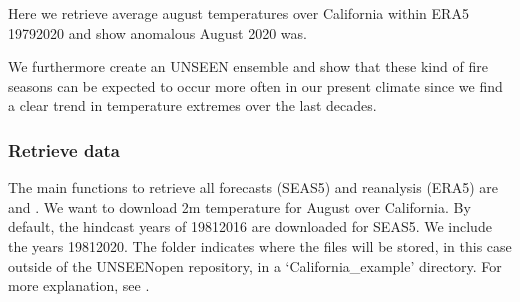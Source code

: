 \documentclass[letterpaper,10pt,english]{sphinxmanual}
\let\sphinxpxdimen\pdfpxdimen\else\newdimen\sphinxpxdimen
\begin{document}
Here we retrieve average august temperatures over California within ERA5 1979\sphinxhyphen{}2020 and show anomalous August 2020 was. \sphinxincludegraphics[width=864\sphinxpxdimen,height=432\sphinxpxdimen]{{California_anomaly1}.png}

We furthermore create an UNSEEN ensemble and show that these kind of fire seasons can be expected to occur more often in our present climate since we find a clear trend in temperature extremes over the last decades.


\subsubsection{Retrieve data}
\label{\detokenize{Notebooks/examples/California_Fires:Retrieve-data}}
The main functions to retrieve all forecasts (SEAS5) and reanalysis (ERA5) are  and . We want to download 2m temperature for August over California. By default, the hindcast years of 1981\sphinxhyphen{}2016 are downloaded for SEAS5. We include the years 1981\sphinxhyphen{}2020. The folder indicates where the files will be stored, in this case outside of the UNSEEN\sphinxhyphen{}open repository, in a ‘California\_example’ directory. For more explanation, see {\hyperref[\detokenize{Notebooks/1.Download/1.Retrieve::doc}]{}}.

{
\begin{sphinxVerbatim}[commandchars=\\\{\}]
\llap{\color{nbsphinxin}[1]:\,\hspace{\fboxrule}\hspace{\fboxsep}} 
 
 

   
   

   
   
\end{sphinxVerbatim}
}
\end{document}
